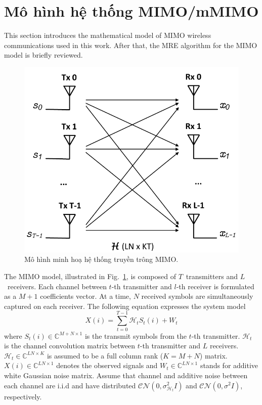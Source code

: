 \section{Mô hình hệ thống MIMO/mMIMO}\label{sec:sm}

This section introduces the mathematical model of MIMO wireless communications used in this work. After that, the MRE algorithm for the MIMO model is briefly reviewed.

\begin{figure}[H]
    \centering
    \includegraphics[width=0.6\linewidth]{figures/sys_model.pdf}
    \caption{Mô hình minh hoạ hệ thống truyền trông MIMO.}
    \label{fig:sys_model}
\end{figure}

The MIMO model, illustrated in Fig.~\ref{fig:sys_model}, is composed of
$T$~transmitters and $L$~receivers. Each channel between $t$-th transmitter and $l$-th receiver is formulated as a $M+1$ coefficients vector. At a time, $N$ received symbols are simultaneously captured on each receiver. The following equation expresses the system model
\begin{equation}
    X(i) = \sum_{t=0}^{T-1}\mathcal{H}_t S_t(i) + W_t
\end{equation}
where $S_t(i) \in \mathbb{C}^{M+N \times 1}$ is the transmit symbols from the $t$-th transmitter. $\mathcal{H}_t$ is the channel convolution matrix between $t$-th transmitter and $L$ receivers. $\mathcal{H}_t \in \mathbb{C}^{LN \times K}$ is assumed to be a full column rank ($K = M+N$) matrix. $X(i) \in \mathbb{C}^{LN \times 1}$ denotes the observed signals and $W_t \in \mathbb{C}^{LN \times 1}$ stands for additive white Gaussian noise matrix. Assume that channel and additive noise between each channel are i.i.d and have distributed $\mathcal{CN}(0, \sigma_{\mathcal{H}_t}^2 I)$ and $\mathcal{CN}(0, \sigma^2 I)$, respectively.

